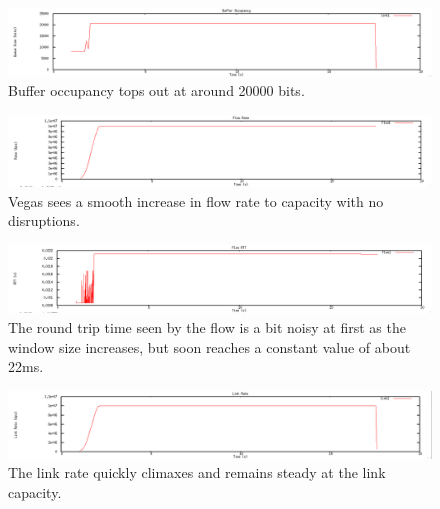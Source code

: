\documentclass[12pt]{article}
\begin{document}
\newpage


\begin{figure}[!ht]
\centering \includegraphics[bb= 0 0 1300 250, scale=.35]{figures/Test0_Vegas/buffer_occ.png}
\caption{Buffer occupancy tops out at around 20000 bits.}
\label{fig:test0_vegas_buffer_occ}
\end{figure}

\begin{figure}[!ht]
\centering \includegraphics[bb= 0 0 1300 250, scale=.35]{figures/Test0_Vegas/flow_rate.png}
\caption{Vegas sees a smooth increase in flow rate to capacity with no disruptions.}
\label{fig:test0_vegas_flow_rate}
\end{figure}

\begin{figure}[!ht]
\centering \includegraphics[bb= 0 0 1300 250, scale=.35]{figures/Test0_Vegas/flow_rtt.png}
\caption{The round trip time seen by the flow is a bit noisy at first as the window size increases, but soon reaches a constant value of about 22ms.}
\label{fig:test0_vegas_flow_rtt}
\end{figure}

\begin{figure}[!ht]
\centering \includegraphics[bb= 0 0 1300 250, scale=.35]{figures/Test0_Vegas/link_rate.png}
\caption{The link rate quickly climaxes and remains steady at the link capacity.  }
\label{fig:test0_vegas_link_rate}
\end{figure}
\end{document}
